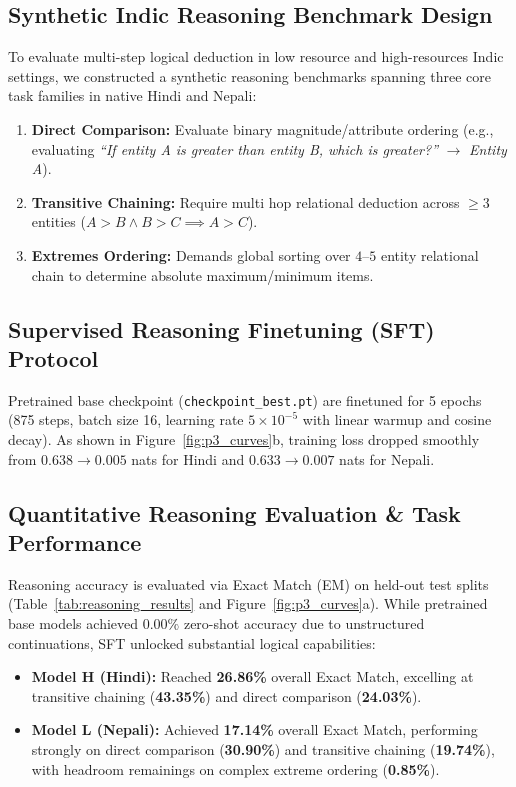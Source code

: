 \documentclass[10pt,a4paper]{article}
\begin{document}
\subsection{Synthetic Indic Reasoning Benchmark Design}
To evaluate multi-step logical deduction in low resource and high-resources Indic settings, we constructed a synthetic reasoning benchmarks spanning three core task families in native Hindi and Nepali:
\begin{enumerate}
    \item \textbf{Direct Comparison:} Evaluate binary magnitude/attribute ordering (e.g., evaluating \textit{``If entity A is greater than entity B, which is greater?''} $\to$ \textit{Entity A}).
    \item \textbf{Transitive Chaining:} Require multi hop relational deduction across $\ge 3$ entities ($A > B \land B > C \implies A > C$).
    \item \textbf{Extremes Ordering:} Demands global sorting over $4$--$5$ entity relational chain to determine absolute maximum/minimum items.
\end{enumerate}

\subsection{Supervised Reasoning Finetuning (SFT) Protocol}
Pretrained base checkpoint (\texttt{checkpoint\_best.pt}) are finetuned for 5 epochs (875 steps, batch size 16, learning rate $5 \times 10^{-5}$ with linear warmup and cosine decay). As shown in Figure~\ref{fig:p3_curves}b, training loss dropped smoothly from $0.638 \to 0.005$ nats for Hindi and $0.633 \to 0.007$ nats for Nepali.

\subsection{Quantitative Reasoning Evaluation \& Task Performance}
Reasoning accuracy is evaluated via Exact Match (EM) on held-out test splits (Table~\ref{tab:reasoning_results} and Figure~\ref{fig:p3_curves}a). While pretrained base models achieved $0.00\%$ zero-shot accuracy due to unstructured continuations, SFT unlocked substantial logical capabilities:
\begin{itemize}
    \item \textbf{Model H (Hindi):} Reached \textbf{26.86\%} overall Exact Match, excelling at transitive chaining (\textbf{43.35\%}) and direct comparison (\textbf{24.03\%}).
    \item \textbf{Model L (Nepali):} Achieved \textbf{17.14\%} overall Exact Match, performing strongly on direct comparison (\textbf{30.90\%}) and transitive chaining (\textbf{19.74\%}), with headroom remainings on complex extreme ordering (\textbf{0.85\%}).
\end{itemize}
\end{document}
